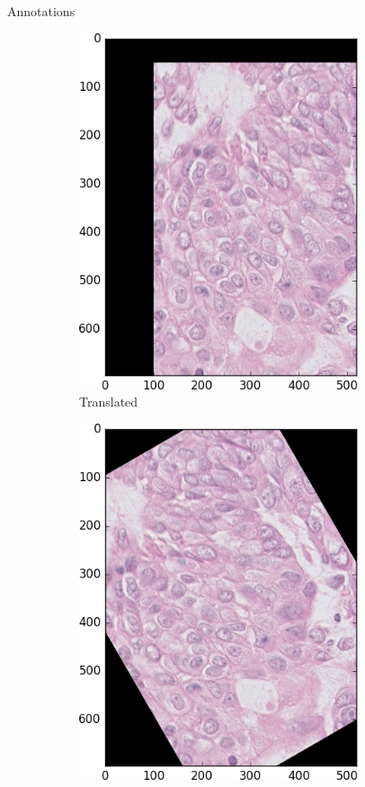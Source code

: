 \documentclass{beamer}
\begin{document}
\begin{frame}{Annotations}
\begin{figure}
\begin{multicols}{6}
\begin{subfigure}{0.2\textwidth}
    \includegraphics[width=0.9\textwidth]{shift.png}\par 
    \caption{Translated}
    \label{fig:shift}
	\end{subfigure}%
	\begin{subfigure}{0.2\textwidth}
    \includegraphics[width=0.9\textwidth]{rot.png}\par 

\end{subfigure}
\end{multicols}
\end{figure}
\end{frame}
\end{document}
